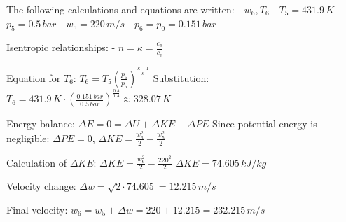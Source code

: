 The following calculations and equations are written:  
- \( w_6, T_6 \)  
- \( T_5 = 431.9 \, K \)  
- \( p_5 = 0.5 \, bar \)  
- \( w_5 = 220 \, m/s \)  
- \( p_6 = p_0 = 0.151 \, bar \)  

Isentropic relationships:  
- \( n = \kappa = \frac{c_p}{c_v} \)  

Equation for \( T_6 \):  
\( T_6 = T_5 \left( \frac{p_6}{p_5} \right)^{\frac{\kappa - 1}{\kappa}} \)  
Substitution:  
\( T_6 = 431.9 \, K \cdot \left( \frac{0.151 \, bar}{0.5 \, bar} \right)^{\frac{0.4}{1.4}} \approx 328.07 \, K \)  

Energy balance:  
\( \Delta E = 0 = \Delta U + \Delta KE + \Delta PE \)  
Since potential energy is negligible:  
\( \Delta PE = 0 \), \( \Delta KE = \frac{w_6^2}{2} - \frac{w_5^2}{2} \)  

Calculation of \( \Delta KE \):  
\( \Delta KE = \frac{w_6^2}{2} - \frac{220^2}{2} \)  
\( \Delta KE = 74.605 \, kJ/kg \)  

Velocity change:  
\( \Delta w = \sqrt{2 \cdot 74.605} = 12.215 \, m/s \)  

Final velocity:  
\( w_6 = w_5 + \Delta w = 220 + 12.215 = 232.215 \, m/s \)